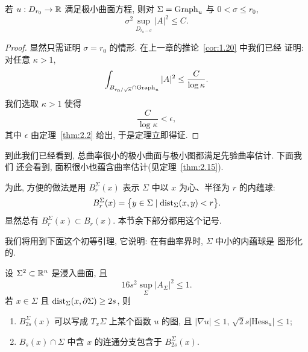 \begin{theorem}
\label{thm:2.3}
若 $u:D_{r_0}\to\mathbb{R}$ 满足极小曲面方程, 则对 $\Sigma=\operatorname{Graph}_u$ 与
$0<\sigma\leq r_0$,
\begin{equation}
\sigma^{2}\sup_{D_{r_0-\sigma}}|A|^{2}\leq C.
\label{eq:2.39}
\end{equation}
\end{theorem}

\begin{proof}
显然只需证明 $\sigma=r_0$ 的情形. 在上一章的推论~\ref{cor:1.20} 中我们已经
证明: 对任意 $\kappa>1$,
\begin{equation}
\int_{B_{r_0/\sqrt{\kappa}}\cap\operatorname{Graph}_u}|A|^{2}
 \leq\frac{C}{\log\kappa}.
\label{eq:2.40}
\end{equation}
我们选取 $\kappa>1$ 使得
\begin{equation}
\frac{C}{\log\kappa}<\epsilon,
\label{eq:2.41}
\end{equation}
其中 $\epsilon$ 由定理~\ref{thm:2.2} 给出, 于是定理立即得证.
\end{proof}

到此我们已经看到, 总曲率很小的极小曲面与极小图都满足先验曲率估计. 下面我们
还会看到, 面积很小也蕴含曲率估计(见定理~\ref{thm:2.15}).

为此, 方便的做法是用 $B_r^{\Sigma}(x)$ 表示 $\Sigma$ 中以 $x$ 为心、半径为 $r$
的内蕴球:
\begin{equation}
B_r^{\Sigma}(x)=\bigl\{y\in\Sigma\mid\operatorname{dist}_{\Sigma}(x,y)<r\bigr\}.
\label{eq:2.42}
\end{equation}
显然总有 $B_r^{\Sigma}(x)\subset B_r(x)$. 本节余下部分都用这个记号.

我们将用到下面这个初等引理, 它说明: 在有曲率界时, $\Sigma$ 中小的内蕴球是
图形化的.

\begin{lemma}[小曲率蕴含图形化]
\label{lem:2.4}
设 $\Sigma^2\subset\mathbb{R}^n$ 是浸入曲面, 且
\begin{equation}
16s^{2}\sup_{\Sigma}|A_{\Sigma}|^{2}\leq1.
\label{eq:2.43}
\end{equation}
若 $x\in\Sigma$ 且 $\operatorname{dist}_{\Sigma}(x,\partial\Sigma)\geq2s$, 则

\begin{enumerate}
\item $B_{2s}^{\Sigma}(x)$ 可以写成 $T_x\Sigma$ 上某个函数 $u$ 的图, 且
  $|\nabla u|\leq1$, $\sqrt{2}s|\mathrm{Hess}_u|\leq1$;
\item $B_s(x)\cap\Sigma$ 中含 $x$ 的连通分支包含于 $B_{2s}^{\Sigma}(x)$.
\end{enumerate}
\end{lemma}

